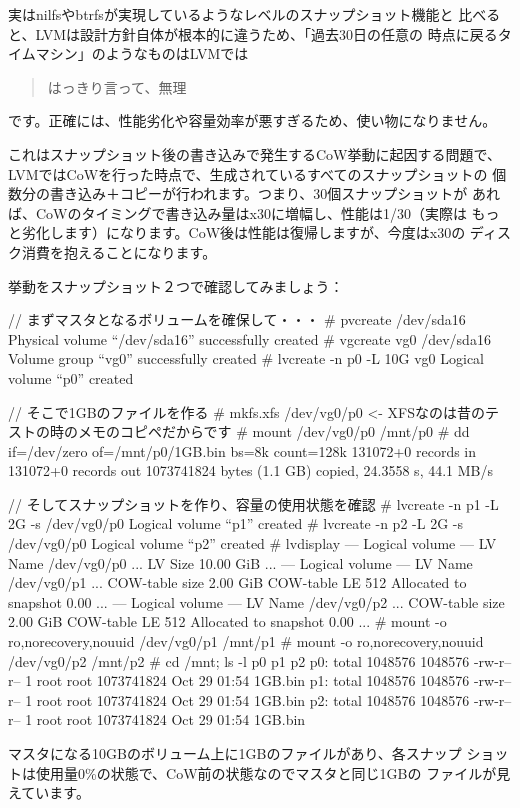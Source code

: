 \documentclass[mingoth,a4paper]{jsarticle}
\begin{document}
実はnilfsやbtrfsが実現しているようなレベルのスナップショット機能と
比べると、LVMは設計方針自体が根本的に違うため、「過去30日の任意の
時点に戻るタイムマシン」のようなものはLVMでは
\begin{quote}
\Large{はっきり言って、無理}
\end{quote}
です。正確には、性能劣化や容量効率が悪すぎるため、使い物になりません。

これはスナップショット後の書き込みで発生するCoW挙動に起因する問題で、
LVMではCoWを行った時点で、生成されているすべてのスナップショットの
個数分の書き込み＋コピーが行われます。つまり、30個スナップショットが
あれば、CoWのタイミングで書き込み量はx30に増幅し、性能は1/30（実際は
もっと劣化します）になります。CoW後は性能は復帰しますが、今度はx30の
ディスク消費を抱えることになります。

挙動をスナップショット２つで確認してみましょう：
\begin{commandline}
// まずマスタとなるボリュームを確保して・・・
# pvcreate /dev/sda16
Physical volume ``/dev/sda16'' successfully created
# vgcreate vg0 /dev/sda16
Volume group ``vg0'' successfully created
# lvcreate -n p0 -L 10G vg0
Logical volume ``p0'' created

// そこで1GBのファイルを作る
# mkfs.xfs /dev/vg0/p0 <- XFSなのは昔のテストの時のメモのコピペだからです
# mount /dev/vg0/p0 /mnt/p0
# dd if=/dev/zero of=/mnt/p0/1GB.bin bs=8k count=128k
131072+0 records in
131072+0 records out
1073741824 bytes (1.1 GB) copied, 24.3558 s, 44.1 MB/s

// そしてスナップショットを作り、容量の使用状態を確認
# lvcreate -n p1 -L 2G -s /dev/vg0/p0
Logical volume ``p1'' created
# lvcreate -n p2 -L 2G -s /dev/vg0/p0
Logical volume ``p2'' created
# lvdisplay
--- Logical volume ---
LV Name                /dev/vg0/p0
...
LV Size                10.00 GiB
...
--- Logical volume ---
LV Name                /dev/vg0/p1
...
COW-table size         2.00 GiB
COW-table LE           512
Allocated to snapshot  0.00%
...
--- Logical volume ---
LV Name                /dev/vg0/p2
...
COW-table size         2.00 GiB
COW-table LE           512
Allocated to snapshot  0.00%
...
# mount -o ro,norecovery,nouuid /dev/vg0/p1 /mnt/p1
# mount -o ro,norecovery,nouuid /dev/vg0/p2 /mnt/p2
# cd /mnt; ls -l p0 p1 p2
p0:
total 1048576
1048576 -rw-r--r-- 1 root root 1073741824 Oct 29 01:54 1GB.bin
p1:
total 1048576
1048576 -rw-r--r-- 1 root root 1073741824 Oct 29 01:54 1GB.bin
p2:
total 1048576
1048576 -rw-r--r-- 1 root root 1073741824 Oct 29 01:54 1GB.bin
\end{commandline}
マスタになる10GBのボリューム上に1GBのファイルがあり、各スナップ
ショットは使用量0\%の状態で、CoW前の状態なのでマスタと同じ1GBの
ファイルが見えています。
\end{document}
